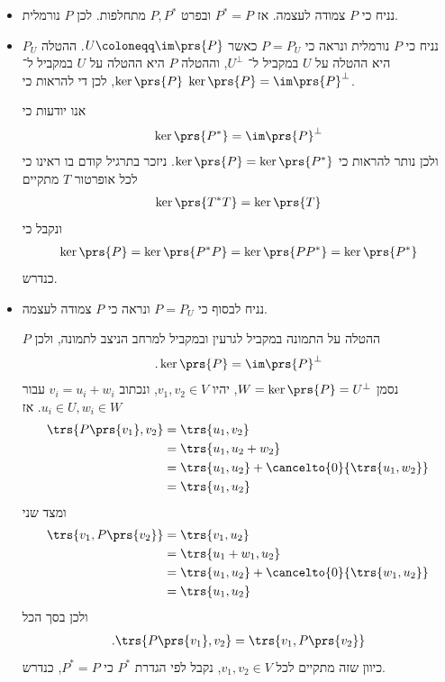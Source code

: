 \documentclass[a4paper,10pt,twoside,openany]{book}
\begin{document}
\begin{solution}
\begin{itemize}
\item נניח כי
$P$
צמודה לעצמה. אז
$P^* = P$
ובפרט
$P, P^*$
מתחלפות. לכן
$P$
נורמלית.

\item נניח כי
$P$
נורמלית ונראה כי
$P = P_U$
כאשר
$U \coloneqq \im\prs{P}$.
ההטלה
$P_U$
היא ההטלה על
$U$
במקביל ל־%
$U^\perp$,
וההטלה
$P$
היא ההטלה על
$U$
במקביל ל־%
$\ker\prs{P}$,
לכן די להראות כי
$\ker\prs{P} = \im\prs{P}^\perp$.

אנו יודעות כי
\begin{align*}
\ker\prs{P^*} = \im\prs{P}^\perp
\end{align*}
ולכן נותר להראות כי
$\ker\prs{P} = \ker\prs{P^*}$.
ניזכר בתרגיל קודם בו ראינו כי לכל אופרטור
$T$
מתקיים
\begin{align*}
\ker\prs{T^* T} = \ker\prs{T}
\end{align*}
ונקבל כי
\begin{align*}
\ker\prs{P} = \ker\prs{P^* P} = \ker\prs{P P^*} = \ker\prs{P^*}
\end{align*}
כנדרש.

\item נניח לבסוף כי
$P = P_U$
ונראה כי
$P$
צמודה לעצמה.

$P$
ההטלה על התמונה במקביל לגרעין ובמקביל למרחב הניצב לתמונה, ולכן
\begin{align*}
\text{.} \ker\prs{P} = \im\prs{P}^\perp
\end{align*}
נסמן
$W = \ker\prs{P} = U^\perp$,
יהיו
$v_1, v_2 \in V$,
ונכתוב
$v_i = u_i + w_i$
עבור
$u_i \in U, w_i \in W$.
אז
\begin{align*}
\trs{P\prs{v_1}, v_2} &= \trs{u_1, v_2}
\\&= \trs{u_1, u_2 + w_2}
\\&= \trs{u_1, u_2} + \cancelto{0}{\trs{u_1, w_2}}
\\&= \trs{u_1, u_2}
\end{align*}
ומצד שני
\begin{align*}
\trs{v_1, P\prs{v_2}} &= \trs{v_1, u_2}
\\&= \trs{u_1 + w_1, u_2}
\\&= \trs{u_1, u_2} + \cancelto{0}{\trs{w_1, u_2}}
\\&= \trs{u_1, u_2}
\end{align*}
ולכן בסך הכל
\begin{align*}
\text{.} \trs{P\prs{v_1}, v_2} = \trs{v_1, P\prs{v_2}}
\end{align*}
כיוון שזה מתקיים לכל
$v_1, v_2 \in V$,
נקבל לפי הגדרת
$P^*$
כי
$P^* = P$,
כנדרש.
\end{itemize}
\end{solution}
\end{document}

